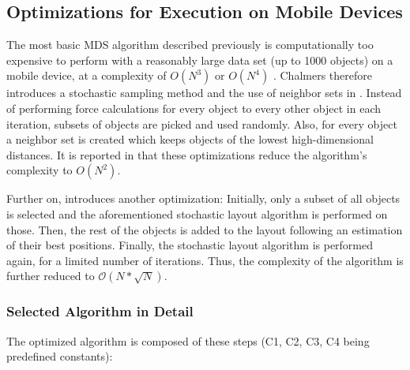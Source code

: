 \subsection{Optimizations for Execution on Mobile Devices}

The most basic MDS algorithm described previously is computationally too expensive to perform with a reasonably large data set (up to 1000 objects) on a mobile device, at a complexity of $O(N^3)$ or $O(N^4)$ \cite{Chalmers:1996:LIT:244979.245035}.
Chalmers therefore introduces a stochastic sampling method and the use of neighbor sets in \cite{Chalmers:1996:LIT:244979.245035}. Instead of performing force calculations for every object to every other object in each iteration, subsets of objects are picked and used randomly. Also, for every object a neighbor set is created which keeps objects of the lowest high-dimensional distances. It is reported in \cite{Chalmers:1996:LIT:244979.245035} that these optimizations reduce the algorithm's complexity to $O(N^2)$.

Further on, \cite{Morrison:2003:FMS} introduces another optimization: Initially, only a subset of all objects is selected and the aforementioned stochastic layout algorithm is performed on those. Then, the rest of the objects is added to the layout following an estimation of their best positions. Finally, the stochastic layout algorithm is performed again, for a limited number of iterations. Thus, the complexity of the algorithm is further reduced to $\mathcal O(N*\sqrt{N})$.

\subsubsection{Selected Algorithm in Detail}

The optimized algorithm is composed of these steps (C1, C2, C3, C4 being predefined constants):


